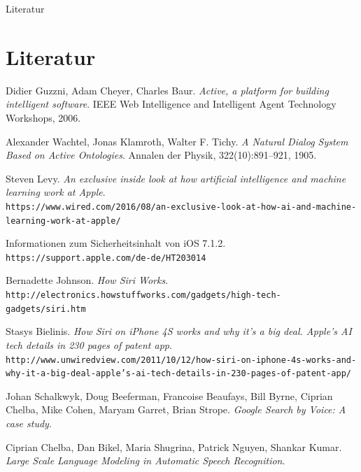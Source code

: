 \documentclass[18pt]{beamer}
\begin{document}
\begin{frame}[allowframebreaks]{Literatur}



\section{Literatur}
\begin{thebibliography}{9}
	
	Didier Guzzni, Adam Cheyer, Charles Baur. 
	\textit{Active, a platform for building intelligent software}. 
	IEEE Web Intelligence and Intelligent Agent Technology Workshops, 2006.
	
	Alexander Wachtel, Jonas Klamroth, Walter F. Tichy. 
	\textit{A Natural Dialog System Based on Active Ontologies}.
	Annalen der Physik, 322(10):891–921, 1905.
	
	Steven Levy.
	\textit{An exclusive inside look at how artificial intelligence and machine learning work at Apple}.
	\\\texttt{https://www.wired.com/2016/08/an-exclusive-look-at-how-ai-and-machine-learning-work-at-apple/}
	
	Informationen zum Sicherheitsinhalt von iOS 7.1.2.
	\\\texttt{https://support.apple.com/de-de/HT203014}
	
	Bernadette Johnson.
	\textit{How Siri Works}.
	\\\texttt{http://electronics.howstuffworks.com/gadgets/high-tech-gadgets/siri.htm}
	
	Stasys Bielinis.
	\textit{How Siri on iPhone 4S works and why it’s a big deal. Apple’s AI tech details in 230 pages of patent app}.
	\\\texttt{http://www.unwiredview.com/2011/10/12/how-siri-on-iphone-4s-works-and-why-it-a-big-deal-apple's-ai-tech-details-in-230-pages-of-patent-app/}
	
	Johan Schalkwyk, Doug Beeferman, Francoise Beaufays, Bill Byrne, Ciprian Chelba, Mike Cohen, Maryam Garret, Brian Strope. 
	\textit{Google Search by Voice: A case study}. 
	
	Ciprian Chelba, Dan Bikel, Maria Shugrina, Patrick Nguyen, Shankar Kumar. 
	\textit{Large Scale Language Modeling in Automatic Speech Recognition}. 
	

\end{thebibliography}
\end{frame}
\end{document}
